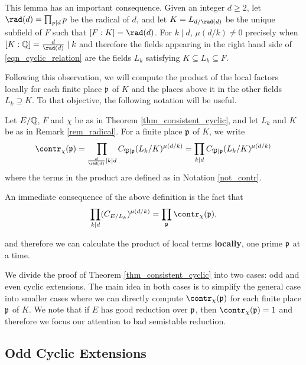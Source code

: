 \begin{rem}\label{rem_radical}
    This lemma has an important consequence. Given an integer $d\geq2$, let $\rad(d)=\prod_{p\mid d}p$ be the radical of $d$, and let $K=L_{d/\rad(d)}$ be the unique subfield of $F$ such that $[F:K]=\rad(d)$. For $k\mid d$, $\mu(d/k)\neq 0$ precisely when $[K:\QQ]=\frac{d}{\rad(d)}\mid k$ and therefore the fields appearing in the right hand side of \eqref{eqn_cyclic_relation} are the fields $L_k$ satisfying $K\subseteq L_k\subseteq F$. 
\end{rem}

Following this observation, we will compute the product of the local factors locally for each finite place $\mathfrak{p}$ of $K$ and the places above it in the other fields $L_k\supseteq K$. To that objective, the following notation will be useful.

\begin{notation}\label{not_local_contr}
    Let $E/\mathbb{Q}$, $F$ and $\chi$ be as in Theorem \ref*{thm_consistent_cyclic}, and let $L_k$ and $K$ be as in Remark \ref*{rem_radical}. For a finite place $\mathfrak{p}$ of $K$, we write
    $$\contr_\chi(\pp)=\prod_{\frac{d}{\rad(d)}\mid k\mid d}C_{\mathfrak{P}\mid\pp}(L_k/K)^{\mu(d/k)}=\prod_{k\mid d}C_{\mathfrak{P}\mid\pp}(L_k/K)^{\mu(d/k)}$$ 
    where the terms in the product are defined as in Notation \ref*{not_contr}. 
\end{notation}

An immediate consequence of the above definition is the fact that 
\begin{equation}\label{eqn_local_contr}
    \prod_{k\mid d}(C_{E/L_k})^{\mu(d/k)}=\prod_\pp\contr_\chi(\pp),
\end{equation}

and therefore we can calculate the product of local terms \textbf{locally}, one prime $\mathfrak{p}$ at a time.

We divide the proof of Theorem \ref*{thm_consistent_cyclic} into two cases: odd and even cyclic extensions. The main idea in both cases is to simplify the general case into smaller cases where we can directly compute $\contr_\chi(\pp)$ for each finite place $\mathfrak{p}$ of $K$. We note that if $E$ has good reduction over $\mathfrak{p}$, then $\contr_\chi(\pp)=1$ and therefore we focus our attention to bad semistable reduction. 

\subsection*{Odd Cyclic Extensions} \label{case_Cp}

